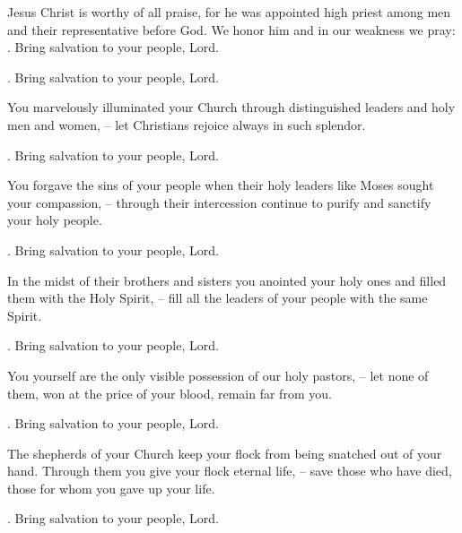 \lettrine[loversize=0.15,lines=2]{J}{}esus Christ is worthy of all praise, for he was appointed high priest among men and their representative before God. We honor him and in our weakness we pray: \Rbar. Bring salvation to your people, Lord.
\par \Rbar. Bring salvation to your people, Lord.

You marvelously illuminated your Church through distinguished leaders and holy men and women,
– let Christians rejoice always in such splendor.
\par \Rbar. Bring salvation to your people, Lord.

You forgave the sins of your people when their holy leaders like Moses sought your compassion,
– through their intercession continue to purify and sanctify your holy people.
\par \Rbar. Bring salvation to your people, Lord.

In the midst of their brothers and sisters you anointed your holy ones and filled them with the Holy Spirit,
– fill all the leaders of your people with the same Spirit.
\par \Rbar. Bring salvation to your people, Lord.

You yourself are the only visible possession of our holy pastors,
– let none of them, won at the price of your blood, remain far from you.
\par \Rbar. Bring salvation to your people, Lord.

The shepherds of your Church keep your flock from being snatched out of your hand. Through them you give your flock eternal life,
– save those who have died, those for whom you gave up your life.
\par \Rbar. Bring salvation to your people, Lord.
